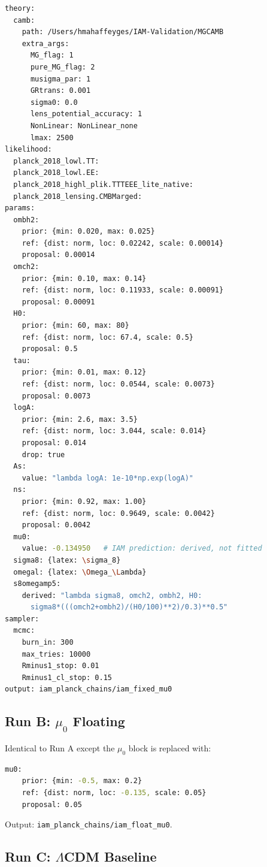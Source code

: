 \documentclass[11pt,letterpaper]{article}
\begin{document}
\begin{lstlisting}[language=bash,caption={Cobaya YAML for Run A (IAM fixed $\mu_0$)}]
theory:
  camb:
    path: /Users/hmahaffeyges/IAM-Validation/MGCAMB
    extra_args:
      MG_flag: 1
      pure_MG_flag: 2
      musigma_par: 1
      GRtrans: 0.001
      sigma0: 0.0
      lens_potential_accuracy: 1
      NonLinear: NonLinear_none
      lmax: 2500
likelihood:
  planck_2018_lowl.TT:
  planck_2018_lowl.EE:
  planck_2018_highl_plik.TTTEEE_lite_native:
  planck_2018_lensing.CMBMarged:
params:
  ombh2:
    prior: {min: 0.020, max: 0.025}
    ref: {dist: norm, loc: 0.02242, scale: 0.00014}
    proposal: 0.00014
  omch2:
    prior: {min: 0.10, max: 0.14}
    ref: {dist: norm, loc: 0.11933, scale: 0.00091}
    proposal: 0.00091
  H0:
    prior: {min: 60, max: 80}
    ref: {dist: norm, loc: 67.4, scale: 0.5}
    proposal: 0.5
  tau:
    prior: {min: 0.01, max: 0.12}
    ref: {dist: norm, loc: 0.0544, scale: 0.0073}
    proposal: 0.0073
  logA:
    prior: {min: 2.6, max: 3.5}
    ref: {dist: norm, loc: 3.044, scale: 0.014}
    proposal: 0.014
    drop: true
  As:
    value: "lambda logA: 1e-10*np.exp(logA)"
  ns:
    prior: {min: 0.92, max: 1.00}
    ref: {dist: norm, loc: 0.9649, scale: 0.0042}
    proposal: 0.0042
  mu0:
    value: -0.134950   # IAM prediction: derived, not fitted
  sigma8: {latex: \sigma_8}
  omegal: {latex: \Omega_\Lambda}
  s8omegamp5:
    derived: "lambda sigma8, omch2, ombh2, H0:
      sigma8*(((omch2+ombh2)/(H0/100)**2)/0.3)**0.5"
sampler:
  mcmc:
    burn_in: 300
    max_tries: 10000
    Rminus1_stop: 0.01
    Rminus1_cl_stop: 0.15
output: iam_planck_chains/iam_fixed_mu0
\end{lstlisting}

\subsection{Run B: $\mu_0$ Floating}

Identical to Run A except the $\mu_0$ block is replaced with:
\begin{lstlisting}[language=bash]
  mu0:
    prior: {min: -0.5, max: 0.2}
    ref: {dist: norm, loc: -0.135, scale: 0.05}
    proposal: 0.05
\end{lstlisting}
Output: \texttt{iam\_planck\_chains/iam\_float\_mu0}.

\subsection{Run C: $\Lambda$CDM Baseline}
\end{document}
